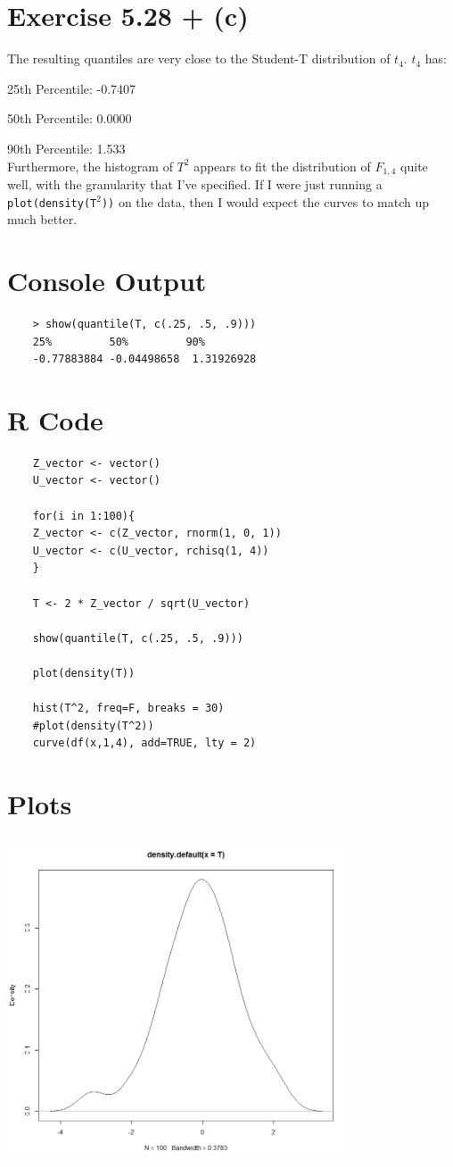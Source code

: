 \documentclass{article}
\begin{document}
\section*{Exercise 5.28 + (c)}
	The resulting quantiles are very close to the Student-T distribution of $t_{4}$. $t_4$ has:
	
	
	25th Percentile: -0.7407
	
	50th Percentile: 0.0000
	
	90th Percentile: 1.533
	\\
	
	Furthermore, the histogram of $T^2$ appears to fit the distribution of $F_{1,4}$ quite well, with the granularity that I've specified. If I were just running a \texttt{plot(density(T$^2$))} on the data, then I would expect the curves to match up much better.
	\section*{Console Output}
	\begin{verbatim}
	> show(quantile(T, c(.25, .5, .9)))
	25%         50%         90% 
	-0.77883884 -0.04498658  1.31926928 
	\end{verbatim}
	\section*{R Code}
	\begin{verbatim}
	Z_vector <- vector()
	U_vector <- vector()
	
	for(i in 1:100){
	Z_vector <- c(Z_vector, rnorm(1, 0, 1))
	U_vector <- c(U_vector, rchisq(1, 4))
	}
	
	T <- 2 * Z_vector / sqrt(U_vector)
	
	show(quantile(T, c(.25, .5, .9)))
	
	plot(density(T))
	
	hist(T^2, freq=F, breaks = 30)
	#plot(density(T^2))
	curve(df(x,1,4), add=TRUE, lty = 2)
	\end{verbatim}
	\section*{Plots}
	\includegraphics[width=4in]{q5}
	
\end{document}
